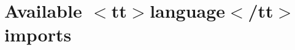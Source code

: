 \chapter{Available \texorpdfstring{$<$}{<}tt\texorpdfstring{$>$}{>}language\texorpdfstring{$<$}{<}/tt\texorpdfstring{$>$}{>} imports}
\hypertarget{md_node__modules_2react-syntax-highlighter_2_a_v_a_i_l_a_b_l_e___l_a_n_g_u_a_g_e_s___p_r_i_s_m}{}\label{md_node__modules_2react-syntax-highlighter_2_a_v_a_i_l_a_b_l_e___l_a_n_g_u_a_g_e_s___p_r_i_s_m}
\label{md_node__modules_2react-syntax-highlighter_2_a_v_a_i_l_a_b_l_e___l_a_n_g_u_a_g_e_s___p_r_i_s_m_autotoc_md27167}%
%



